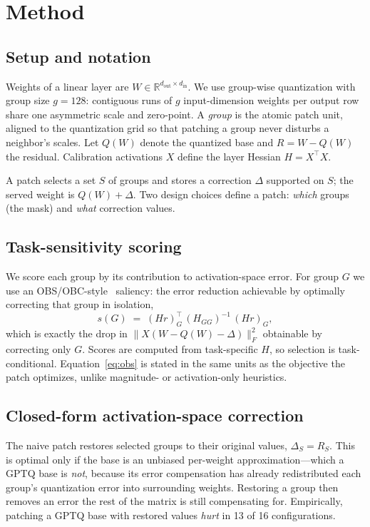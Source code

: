 \documentclass[11pt]{article}
\begin{document}
\section{Method}
\label{sec:method}

\subsection{Setup and notation}
Weights of a linear layer are $W \in \mathbb{R}^{d_\text{out}\times d_\text{in}}$.
We use group-wise quantization with group size $g{=}128$: contiguous runs of
$g$ input-dimension weights per output row share one asymmetric scale and
zero-point. A \emph{group} is the atomic patch unit, aligned to the
quantization grid so that patching a group never disturbs a neighbor's
scales. Let $Q(W)$ denote the quantized base and $R = W - Q(W)$ the residual.
Calibration activations $X$ define the layer Hessian $H = X^\top X$.

A patch selects a set $S$ of groups and stores a correction $\Delta$ supported
on $S$; the served weight is $Q(W) + \Delta$. Two design choices define a
patch: \emph{which} groups (the mask) and \emph{what} correction values.

\subsection{Task-sensitivity scoring}
We score each group by its contribution to activation-space error. For group
$G$ we use an OBS/OBC-style~\cite{lecun1989obd,frantar2022gptq} saliency: the
error reduction achievable by optimally correcting that group in isolation,
\begin{equation}
  s(G) \;=\; (Hr)_G^\top \, (H_{GG})^{-1} \, (Hr)_G,
  \label{eq:obs}
\end{equation}
which is exactly the drop in $\lVert X(W - Q(W) - \Delta)\rVert_F^2$ obtainable
by correcting only $G$. Scores are computed from task-specific $H$, so
selection is task-conditional. Equation~\eqref{eq:obs} is stated in the same
units as the objective the patch optimizes, unlike magnitude- or
activation-only heuristics.

\subsection{Closed-form activation-space correction}
The naive patch restores selected groups to their original values,
$\Delta_S = R_S$. This is optimal only if the base is an unbiased per-weight
approximation---which a GPTQ base is \emph{not}, because its error compensation
has already redistributed each group's quantization error into surrounding
weights. Restoring a group then removes an error the rest of the matrix is
still compensating for. Empirically, patching a GPTQ base with restored values
\emph{hurt} in 13 of 16 configurations.
\end{document}
